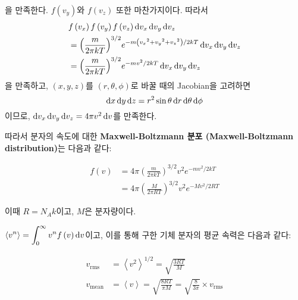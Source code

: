 \begin{obs}
            을 만족한다. $f\left(v_y\right)$와 $f\left(v_z\right)$ 또한 마찬가지이다. 따라서 
                    \begin{align*}
                        &f\left(v_x\right) f\left(v_y\right) f\left(v_z\right) \difform {v_x} \difform {v_y} \difform {v_z} \\
                        &= 
                        {\left(\frac{m}{2 \pi kT}\right)}^{3/2} e^{-m\left({v_x}^2 + {v_y}^2 + {v_z}^2\right)/2kT} \difform v_x \difform v_y \difform v_z \\
                        &={\left(\frac{m}{2\pi k T}\right)}^{3/2} e^{-mv^2 /2kT} \difform v_x \difform v_y \difform v_z
                    \end{align*}
            을 만족하고, $\left(x,y,z\right)$를 $\left(r, \theta, \phi\right)$로 바꿀 때의 Jacobian을 고려하면
            \begin{equation*}
                    \operatorname{d\!} x \operatorname{d\!} y \operatorname{d\!} z = r^2 \sin{\theta} \operatorname{d\!} r \operatorname{d\!} \theta \operatorname{d\!} \phi
            \end{equation*}
            이므로, $\operatorname{d\!} v_x \operatorname{d\!} v_y \operatorname{d\!} v_z = 4 \pi v^2 \operatorname{d\!} v$를 만족한다. 
            \end{obs}
            따라서 분자의 속도에 대한 
            \textbf{Maxwell-Boltzmann 분포 (Maxwell-Boltzmann distribution)}는 다음과 같다:
                \begin{thm}
                    \begin{align*}
                        f \left( v \right) &= 4 \pi {\left(\frac{m}{2\pi kT} \right)}^{3/2} v^2 e^{-mv^2 / 2kT} \\
                        &=4 \pi \left( \frac{M}{2\pi RT} \right)^{3/2} v^2 e^{-Mv^2 / 2RT}
                    \end{align*}
                \end{thm}
            이때 $R = N_A k$이고, $M$은 분자량이다.
            \par $\displaystyle\left\langle v^n \right\rangle = \int_{0}^{\infty} v^n f \left(v\right) \operatorname{d\!} v$이고, 이를 통해 구한 기체 분자의 평균 속력은 다음과 같다:
            \begin{obs}[기체 분자의 평균 속력]
                \begin{align*}
                    v_{\mathrm{rms}} &= \left< v^2 \right>^{1/2} = \sqrt{\frac{3RT}{M}} \\
                    v_{\mathrm{mean}} &= \left< v \right> = \sqrt{\frac{8RT}{\pi M}} = \sqrt{\frac{8}{3 \pi}} \times v_{\mathrm{rms}}
                \end{align*}
            \end{obs}
